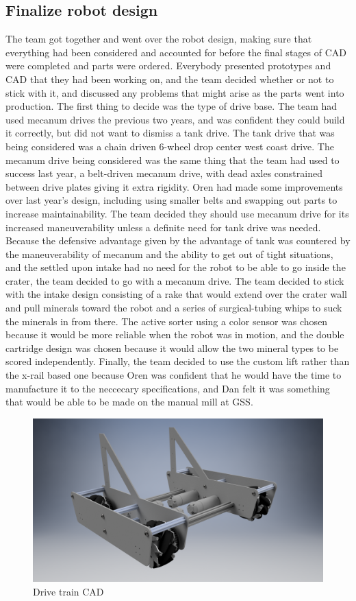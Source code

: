 \documentclass{article}
\begin{document}
\subsection{Finalize robot design}
The team got together and went over the robot design, making sure that everything had been considered and accounted for before the final stages of CAD were completed and parts were ordered. Everybody presented prototypes and CAD that they had been working on, and the team decided whether or not to stick with it, and discussed any problems that might arise as the parts went into production. The first thing to decide was the type of drive base. The team had used mecanum drives the previous two years, and was confident they could build it correctly, but did not want to dismiss a tank drive. The tank drive that was being considered was a chain driven 6-wheel drop center west coast drive. The mecanum drive being considered was the same thing that the team had used to success last year, a belt-driven mecanum drive, with dead axles constrained between drive plates giving it extra rigidity. Oren had made some improvements over last year's design, including using smaller belts and swapping out parts to increase maintainability. The team decided they should use mecanum drive for its increased maneuverability unless a definite need for tank drive was needed. Because the defensive advantage given by the advantage of tank was countered by the maneuverability of mecanum and the ability to get out of tight situations, and the settled upon intake had no need for the robot to be able to go inside the crater, the team decided to go with a mecanum drive. The team decided to stick with the intake design consisting of a rake that would extend over the crater wall and pull minerals toward the robot and a series of surgical-tubing whips to suck the minerals in from there. The active sorter using a color sensor was chosen because it would be more reliable when the robot was in motion, and the double cartridge design was chosen because it would allow the two mineral types to be scored independently. Finally, the team decided to use the custom lift rather than the x-rail based one because Oren was confident that he would have the time to manufacture it to the neccecary specifications, and Dan felt it was something that would be able to be made on the manual mill at GSS.

\begin{figure}
    \centering
    \includegraphics[width=.6 \textwidth, ]{06_10-08/images/robot[1].png}
    \caption{Drive train CAD}
    \label{Dive train CAD}
\end{figure}
\end{document}
